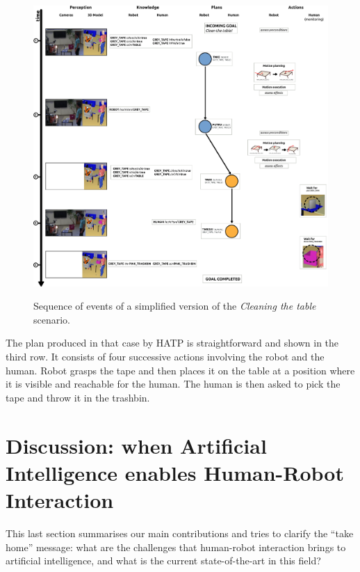 \documentclass[preprint,3p,times]{elsarticle}
\begin{document}
\begin{figure}[thpb]
  \centering
    \includegraphics[width=1.0\textwidth]{manip_run.pdf} \\
        \caption {Sequence of events of a simplified version of the \emph{Cleaning the table} scenario.}
  \label{fig|cleantable-timeline}
\end{figure}


The plan produced in that case by HATP is straightforward and shown in the
third row. It consists of four successive actions involving the robot and the
human. Robot grasps the tape and then places it on the table at a position
where it is visible and reachable for the human. The human is then asked to pick
the tape and throw it in the trashbin.


\section{Discussion: when Artificial Intelligence enables Human-Robot
Interaction}
\label{sect|conclusion}

This last section summarises our main contributions and tries to clarify the ``take home'' message: what are the challenges
that human-robot interaction brings to artificial intelligence, and what is the
current state-of-the-art in this field?
\end{document}

